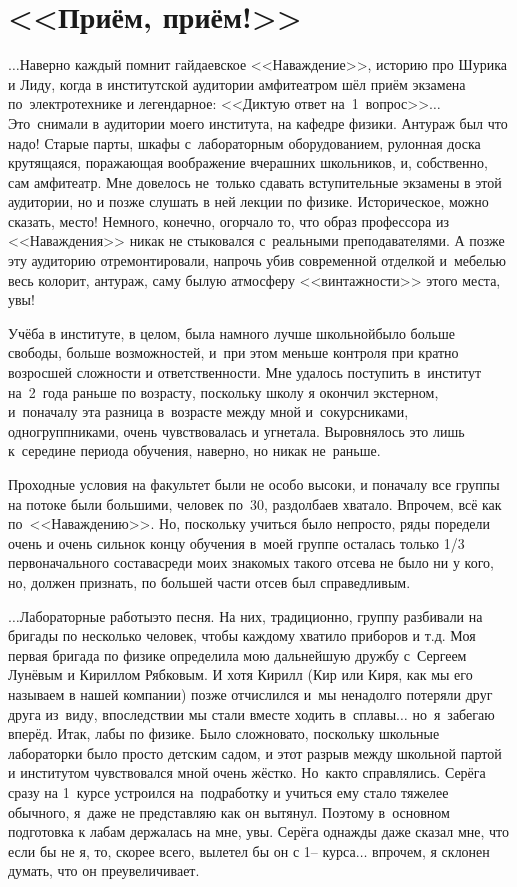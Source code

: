 \newpage
\section*{<<Приём, приём!>>}

$\ldots$Наверно каждый помнит гайдаевское <<Наваждение>>, историю про Шурика и Лиду, когда в институтской аудитории амфитеатром шёл приём экзамена по~электротехнике и легендарное: <<Диктую ответ на~1~вопрос>>$\ldots$ Это~снимали в аудитории моего института, на кафедре физики. Антураж был что надо! Старые парты, шкафы с~лабораторным оборудованием, рулонная доска крутящаяся, поражающая воображение вчерашних школьников, и, собственно, сам амфитеатр. Мне довелось не~только сдавать вступительные экзамены в этой аудитории, но и позже слушать в ней лекции по физике. Историческое, можно сказать, место! Немного, конечно, огорчало то, что образ профессора из <<Наваждения>> никак не стыковался с~реальными преподавателями. А позже эту аудиторию отремонтировали, напрочь убив современной отделкой и~мебелью весь колорит, антураж, саму былую атмосферу <<винтажности>> этого места, увы!

Учёба в институте, в целом, была намного лучше школьной\mdash было больше свободы, больше возможностей, и~при этом меньше контроля при кратно возросшей сложности и ответственности. Мне удалось поступить в~институт на~2~года раньше по возрасту, поскольку школу я окончил экстерном, и~поначалу эта разница в~возрасте между мной и~сокурсниками, одногруппниками, очень чувствовалась и угнетала. Выровнялось это лишь к~середине периода обучения, наверно, но никак не~раньше.

Проходные условия на факультет были не особо высоки, и поначалу все группы на потоке были большими, человек по~30, раздолбаев хватало. Впрочем, всё как по~<<Наваждению>>. Но, поскольку учиться было непросто, ряды поредели очень и очень сильно\mdash к концу обучения в~моей группе осталась только 1/3 первоначального состава\mdash среди моих знакомых такого отсева не было ни у кого, но, должен признать, по большей части отсев был справедливым.

$\ldots$Лабораторные работы\mdash это песня. На них, традиционно, группу разбивали на бригады по несколько человек, чтобы каждому хватило приборов и т.д. Моя первая бригада по физике определила мою дальнейшую дружбу с~Сергеем Лунёвым и Кириллом Рябковым. И хотя Кирилл (Кир или Киря, как мы его называем в нашей компании) позже отчислился и~мы ненадолго потеряли друг друга из~виду, впоследствии мы стали вместе ходить в~сплавы$\ldots$ но~я~забегаю вперёд. Итак, лабы по физике. Было сложновато, поскольку школьные лабораторки было просто детским садом, и этот разрыв между школьной партой и институтом чувствовался мной очень жёстко. Но~как\sdash то справлялись. Серёга сразу на 1~курсе устроился на~подработку и учиться ему стало тяжелее обычного, я~даже не представляю как он вытянул. Поэтому в~основном подготовка к лабам держалась на мне, увы. Серёга однажды даже сказал мне, что если бы не я, то, скорее всего, вылетел бы он с 1\thinspace\nobreakdash-- курса$\ldots$ впрочем, я склонен думать, что он преувеличивает. 

